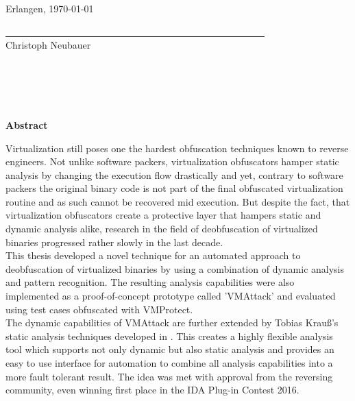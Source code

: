 \documentclass[10pt,twoside,a4paper,bibliography=totoc]{scrbook}
\newcommand{\echoName}[1]{Christoph Neubauer}
\newcommand{\echoOther}[1]{Tobias Krau{\ss}}
\begin{document}
Erlangen, \today
\begin{flushright}
	\underline{\ \ \ \ \ \ \ \ \ \ \ \ \ \ \ \ \ \ \ \ \ \ \ \ \ 
		\ \ \ \ \ \ \ \ \ \ \ \ \ \ \ \ \ \ \ \ \ \ \ \ \ \ \ \ \ 
	} \\
	\small{\echoName\\}
\end{flushright}

%
% 

\chapter*{\ }

\vspace{2em}
\begin{center}
	\begin{large}
		\textbf{Abstract}
	\end{large}
\end{center}
\vspace{0.75em}
Virtualization still poses one the hardest obfuscation techniques known to reverse engineers. Not unlike software packers, virtualization obfuscators hamper static analysis by changing the execution flow drastically and yet, contrary to software packers the original binary code is not part of the final obfuscated virtualization routine and as such cannot be recovered mid execution. But despite the fact, that virtualization obfuscators create a protective layer that hampers static and dynamic analysis alike, research in the field of deobfuscation of virtualized binaries progressed rather slowly in the last decade. \\
This thesis developed a novel technique for an automated approach to deobfuscation of virtualized binaries by using a combination of dynamic analysis and pattern recognition. The resulting analysis capabilities were also implemented as a proof-of-concept prototype called 'VMAttack' and evaluated using test cases obfuscated with VMProtect.\\
The dynamic capabilities of VMAttack are further extended by \echoOther{}'s static analysis techniques developed in \cite{Krau:Thesis2016}. This creates a highly flexible analysis tool which supports not only dynamic but also static analysis and provides an easy to use interface for automation to combine all analysis capabilities into a more fault tolerant result. The idea was met with approval from the reversing community, even winning first place in the IDA Plug-in Contest 2016.\\
\newline
\end{document}

